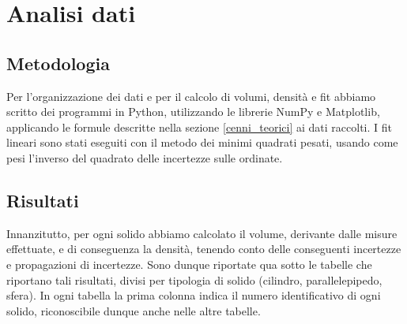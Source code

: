 \documentclass[a4paper]{article}
\begin{document}
\section{Analisi dati}

\subsection{Metodologia}
Per l'organizzazione dei dati e per il calcolo di volumi, densità e fit abbiamo scritto dei programmi in Python, utilizzando le librerie NumPy e Matplotlib, applicando le formule descritte nella sezione \ref{cenni_teorici} ai dati raccolti. I fit lineari sono stati eseguiti con il metodo dei minimi quadrati pesati, usando come pesi l'inverso del quadrato delle incertezze sulle ordinate.

\subsection{Risultati}
Innanzitutto, per ogni solido abbiamo calcolato il volume, derivante dalle misure effettuate, e di conseguenza la densità, tenendo conto delle conseguenti incertezze e propagazioni di incertezze. Sono dunque riportate qua sotto le tabelle che riportano tali risultati, divisi per tipologia di solido (cilindro, parallelepipedo, sfera). In ogni tabella la prima colonna indica il numero identificativo di ogni solido, riconoscibile dunque anche nelle altre tabelle.
\end{document}

